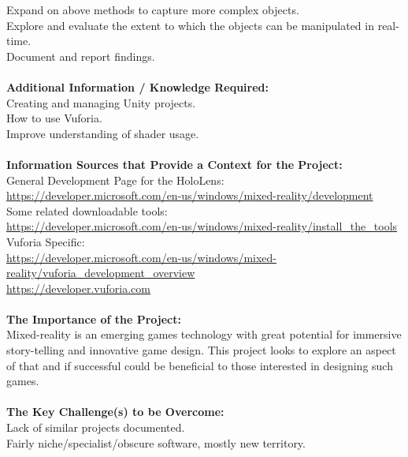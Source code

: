 \documentclass[12pt,a4paper]{article}
\begin{document}
\begin{appendices}
Expand on above methods to capture more complex objects. \\
Explore and evaluate the extent to which the objects can be manipulated in real-time. \\
Document and report findings. \\ \\
\textbf{Additional Information / Knowledge Required:} \\
Creating and managing Unity projects. \\
How to use Vuforia. \\
Improve understanding of shader usage. \\ \\
\textbf{Information Sources that Provide a Context for the Project:} \\
General Development Page for the HoloLens: \\
\url{https://developer.microsoft.com/en-us/windows/mixed-reality/development} \\
Some related downloadable tools: \\
\url{https://developer.microsoft.com/en-us/windows/mixed-reality/install_the_tools} \\
Vuforia Specific: \\
\url{https://developer.microsoft.com/en-us/windows/mixed-reality/vuforia_development_overview} \\
\url{https://developer.vuforia.com} \\ \\
\textbf{The Importance of the Project:} \\
Mixed-reality is an emerging games technology with great potential for immersive story-telling and innovative game design. This project looks to explore an aspect of that and if successful could be beneficial to those interested in designing such games. \\ \\
\textbf{The Key Challenge(s) to be Overcome:} \\
Lack of similar projects documented. \\
Fairly niche/specialist/obscure software, mostly new territory. \\
\newpage


\end{appendices}
\end{document}
